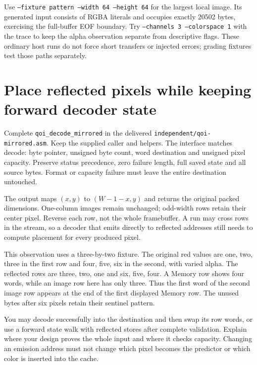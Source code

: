 Use \texttt{--fixture pattern --width 64 --height 64} for the largest local
image. Its generated input consists of RGBA literals and occupies exactly
20502 bytes, exercising the full-buffer EOF boundary. Try
\texttt{--channels 3 --colorspace 1} with the trace to keep the alpha observation
separate from descriptive flags. These ordinary host runs do not force short
transfers or injected errors; grading fixtures test those paths separately.

\section{Place reflected pixels while keeping forward decoder state}

Complete \texttt{qoi\_decode\_mirrored} in the delivered
\texttt{independent/qoi-mirrored.asm}. Keep the supplied caller and
helpers. The interface matches decode: byte pointer, unsigned byte count,
word destination and unsigned pixel capacity. Preserve status precedence,
zero failure length, full saved state and all source bytes. Format or capacity
failure must leave the entire destination untouched.

The output maps $(x,y)$ to $(W-1-x,y)$ and returns the original packed dimensions.
One-column images remain unchanged; odd-width rows retain their center pixel.
Reverse each row, not the whole framebuffer. A run may cross rows in the stream,
so a decoder that emits directly to reflected addresses still needs to compute
placement for every produced pixel.



This observation uses a three-by-two fixture. The original red values are
one, two, three in the first row and four, five, six in the second, with varied
alpha. The reflected rows are three, two, one and six, five, four. A Memory row
shows four words, while an image row here has only three. Thus the first word of
the second image row appears at the end of the first displayed Memory row.
The unused bytes after six pixels retain their sentinel pattern.

You may decode successfully into the destination and then swap its row words,
or use a forward state walk with reflected stores after complete validation.
Explain where your design proves the whole input and where it checks capacity.
Changing an emission address must not change which pixel becomes the predictor
or which color is inserted into the cache.


